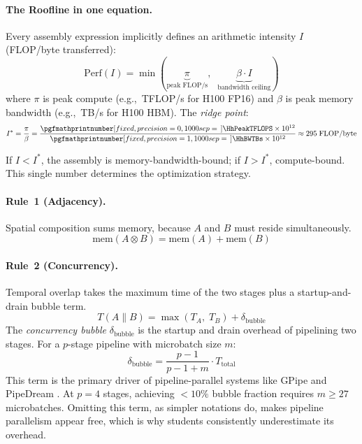 \documentclass[10pt,twocolumn]{article}
\newcommand{\cval}[1]{\pgfmathprintnumber[fixed, precision=1, 1000 sep={\,}]{#1}}
\newcommand{\cvalint}[1]{\pgfmathprintnumber[fixed, precision=0, 1000 sep={\,}]{#1}}
\begin{document}
\paragraph{The Roofline in one equation.} Every assembly expression implicitly defines an arithmetic intensity $I$ (FLOP/byte transferred):
\begin{equation}
\label{eq:roofline}
\text{Perf}(I) = \min\!\left(\underbrace{\pi}_{\text{peak FLOP/s}},\;\; \underbrace{\beta \cdot I}_{\text{bandwidth ceiling}}\right)
\end{equation}
where $\pi$ is peak compute (e.g., \cvalint{\HhPeakTFLOPS}\,TFLOP/s for H100 FP16) and $\beta$ is peak memory bandwidth (e.g., \cval{\HhBWTBs}\,TB/s for H100 HBM). The \emph{ridge point}:
\begin{equation}
\label{eq:ridge}
I^{*} = \frac{\pi}{\beta} = \frac{\cvalint{\HhPeakTFLOPS} \times 10^{12}}{\cval{\HhBWTBs} \times 10^{12}} \approx 295 \;\text{FLOP/byte}
\end{equation}

If $I < I^{*}$, the assembly is memory-bandwidth-bound; if $I > I^{*}$, compute-bound. This single number determines the optimization strategy.

\paragraph{Rule~1 (Adjacency).} Spatial composition sums memory, because $A$ and $B$ must reside simultaneously.
\begin{equation}
\label{eq:parallel-mem}
\text{mem}(A \otimes B) = \text{mem}(A) + \text{mem}(B)
\end{equation}

\paragraph{Rule~2 (Concurrency).} Temporal overlap takes the maximum time of the two stages plus a startup-and-drain bubble term.
\begin{equation}
\label{eq:concurrent-time}
T(A \parallel B) = \max(T_A,\; T_B) + \delta_{\text{bubble}}
\end{equation}
The \emph{concurrency bubble} $\delta_{\text{bubble}}$ is the startup and drain overhead of pipelining two stages. For a $p$-stage pipeline with microbatch size $m$:
\begin{equation}
\label{eq:bubble}
\delta_{\text{bubble}} = \frac{p - 1}{p - 1 + m} \cdot T_{\text{total}}
\end{equation}
This term is the primary driver of pipeline-parallel systems like GPipe \citep{huang2019gpipe} and PipeDream \citep{narayanan2019}. At $p = 4$ stages, achieving $<10\%$ bubble fraction requires $m \geq 27$ microbatches. Omitting this term, as simpler notations do, makes pipeline parallelism appear free, which is why students consistently underestimate its overhead.
\end{document}

